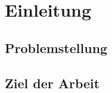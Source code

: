 \chapter{Einleitung}



\section{Problemstellung}
\label{sec:Problemstellung}


\section{Ziel der Arbeit}
\label{sec:ziel}


